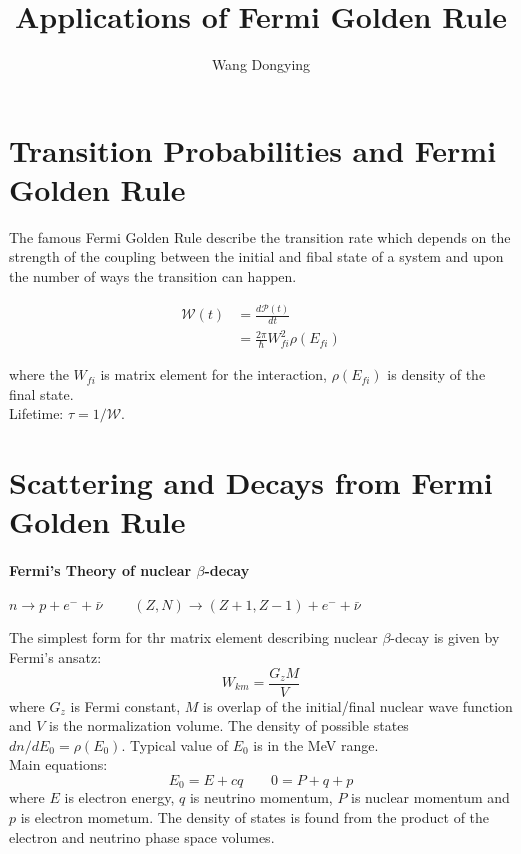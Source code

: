 \documentclass{article}
\author{Wang Dongying}
\title{Applications of Fermi Golden Rule}
\begin{document}
\maketitle

	\section{Transition Probabilities and Fermi Golden Rule}

		The famous Fermi Golden Rule describe the transition rate which depends on the strength of the coupling between the initial and fibal state of a system and upon the number of ways the transition can happen.

		\begin{equation}
		\begin{aligned}
			\mathscr{W}(t) &= \frac{d\mathscr{P}(t)}{dt}\\
						   &= \frac{2\pi}{\hbar}W_{fi}^{2}\rho(E_{fi})
		\end{aligned}
		\end{equation}

		where the $W_{fi}$ is matrix element for the interaction, $\rho(E_{fi})$ is density of the final state.\\

		Lifetime: $\tau = 1/\mathscr{W}$.

	\section{Scattering and Decays from Fermi Golden Rule}

		\paragraph{Fermi's Theory of nuclear $\beta$-decay}

			$n \to p + e^{-} + \bar{\nu}\ \ \ \ \ \ \ \ \ \ (Z,N) \to (Z+1, Z-1) + e^{-} + \bar{\nu}$

			The simplest form for thr matrix element describing nuclear $\beta$-decay is given by Fermi's ansatz:
			\begin{equation}
				W_{km} = \frac{G_{z}M}{V}
			\end{equation}
			where $G_{z}$ is Fermi constant, $M$ is overlap of the initial/final nuclear wave function and $V$ is the normalization volume. The density of possible states $dn/dE_{0} = \rho(E_{0})$. Typical value of $E_{0}$ is in the MeV range.\\
			Main equations:
			$$E_{0} = E + cq\ \ \ \ \ \ \ \ \ 0 = P + q + p$$
			where $E$ is electron energy, $q$ is neutrino momentum, $P$ is nuclear momentum and $p$ is electron mometum. The density of states is found from the product of the electron and neutrino phase space volumes.
\end{document}

